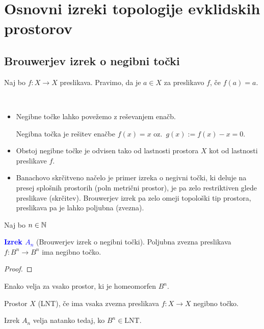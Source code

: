 \section{Osnovni izreki topologije evklidskih prostorov}
\subsection{Brouwerjev izrek o negibni točki}
\begin{definicija}
    Naj bo \(f: X \to X\) preslikava. Pravimo, da je \(a \in X\)  za preslikavo \(f\), če \(f(a) = a\).
\end{definicija}

\begin{opomba}
    \ 
    \begin{itemize}
        \item Negibne točke lahko povežemo z reševanjem enačb. 
        
        Negibna točka je rešitev enačbe \(f(x)=  x\) oz.\ \(g(x) := f(x) - x = 0\).
        \item Obstoj negibne točke je odvisen tako od lastnosti prostora \(X\) kot od lastnosti preslikave \(f\).
        \item Banachovo skrčitveno načelo je primer izreka o negivni točki, ki deluje na presej splošnih prostorih (poln metrični prostor), je pa zelo restriktiven glede preslikave (skrčitev). Brouwerjev izrek pa zelo omeji topološki tip prostora, preslikava pa je lahko poljubna (zvezna).
    \end{itemize}
\end{opomba}

Naj bo \(n \in \mathbb{N}\)

\textcolor{blue}{\textbf{Izrek \(A_n\)}} (Brouwerjev izrek o negibni točki).
Poljubna zvezna preslikava \(f: B^n \to B^n\) ima negibno točko.

\begin{proof}
    \todo{}
\end{proof}

\begin{opomba}
    Enako velja za vsako prostor, ki je homeomorfen \(B^n\).
\end{opomba}

\begin{definicija}
    Prostor \(X\)  (LNT), če ima vsaka zvezna preslikava \(f: X \to X\) negibno točko.
\end{definicija}

\begin{opomba}
    Izrek \(A_n\) velja natanko tedaj, ko \(B^n \in \text{LNT}\).
\end{opomba}

